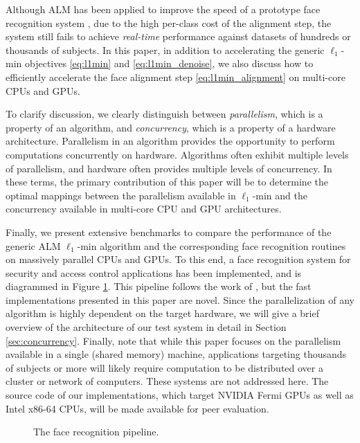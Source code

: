 \documentclass[preprint]{sigplanconf}
\begin{document}
Although ALM has been applied to improve the speed of a prototype face recognition system \cite{WagnerA2011-PAMI},
due to the high per-class cost
of the alignment step, the system still fails to achieve \emph{real-time}
performance against datasets of hundreds or thousands of subjects.  In this paper,
in addition to accelerating the generic
$\ell_1$-min objectives \eqref{eq:l1min} and \eqref{eq:l1min_denoise}, we 
also discuss how to efficiently accelerate the face alignment step
\eqref{eq:l1min_alignment} on multi-core CPUs and GPUs.

To clarify discussion, we clearly distinguish between {\em parallelism},
which is a property of an algorithm, and {\em concurrency}, which is a
property of a hardware architecture. Parallelism in an algorithm provides the
opportunity to perform computations concurrently on hardware.  Algorithms often
exhibit multiple levels of parallelism, and hardware often provides multiple
levels of concurrency.  In these terms, the primary contribution of this paper
will be to determine the optimal mappings between the parallelism available in
$\ell_1$-min and the concurrency available in multi-core CPU and GPU
architectures.

Finally, we present extensive benchmarks to compare the performance of the
generic ALM $\ell_1$-min algorithm and the corresponding face recognition
routines on massively parallel CPUs and GPUs.  To this end, a face
recognition system for security and access control applications has been implemented, 
and is diagrammed in Figure \ref{fig:pipeline}. This pipeline follows the work of \cite{WagnerA2011-PAMI}, but
the fast implementations presented in this paper are novel.
Since the parallelization of any algorithm
is highly dependent on the target hardware, we will give a brief overview of
the architecture of our test system in detail in Section
\ref{sec:concurrency}.
Finally, note that 
while this paper focuses on the parallelism available in a single (shared memory) machine,
applications targeting thousands of subjects or more will likely require computation to be
distributed over a cluster or network of computers. These systems are not addressed here.
The source code of our implementations, which target NVIDIA Fermi GPUs
as well as Intel x86-64 CPUs, will be made available for peer evaluation.
\begin{figure}
\centering
{\tiny }
\caption{The face recognition pipeline.}
\label{fig:pipeline}
\end{figure}
\end{document}
